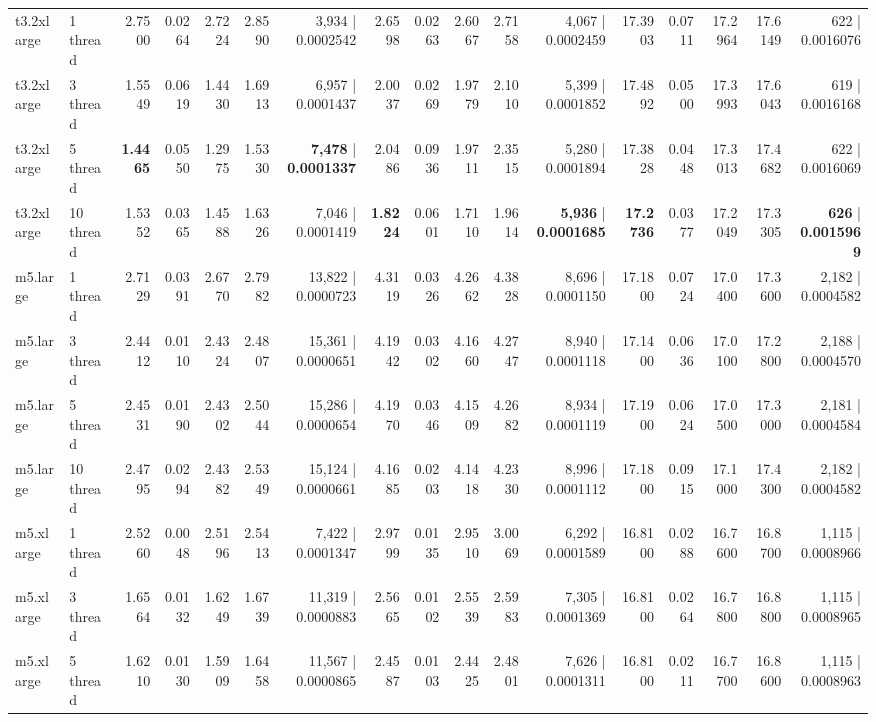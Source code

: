 \documentclass[conference]{IEEEtran}
\begin{document}
\begin{table}[h]
{\begin{tabular}{ll|rrrrr|rrrrr|rrrrr}
			\midrule
			t3.2xlarge & 1 thread & 2.7500 & 0.0264 & 2.7224 & 2.8590 & 3,934 | 0.0002542 & 2.6598 & 0.0263 & 2.6067 & 2.7158 & 4,067 | 0.0002459 & 17.3903 & 0.0711 & 17.2964 & 17.6149 & 622 | 0.0016076 \\
			t3.2xlarge & 3 thread & 1.5549 & 0.0619 & 1.4430 & 1.6913 & 6,957 | 0.0001437 & 2.0037 & 0.0269 & 1.9779 & 2.1010 & 5,399 | 0.0001852 & 17.4892 & 0.0500 & 17.3993 & 17.6043 & 619 | 0.0016168 \\
			t3.2xlarge & 5 thread & \textbf{1.4465} & 0.0550 & 1.2975 & 1.5330 & \textbf{7,478} | \textbf{0.0001337} & 2.0486 & 0.0936 & 1.9711 & 2.3515 & 5,280 | 0.0001894 & 17.3828 & 0.0448 & 17.3013 & 17.4682 & 622 | 0.0016069 \\
			t3.2xlarge & 10 thread & 1.5352 & 0.0365 & 1.4588 & 1.6326 & 7,046 | 0.0001419 & \textbf{1.8224} & 0.0601 & 1.7110 & 1.9614 & \textbf{5,936} | \textbf{0.0001685} & \textbf{17.2736} & 0.0377 & 17.2049 & 17.3305 & \textbf{626} | \textbf{0.0015969} \\
			\midrule
			m5.large & 1 thread & 2.7129 & 0.0391 & 2.6770 & 2.7982 & 13,822 | 0.0000723 & 4.3119 & 0.0326 & 4.2662 & 4.3828 & 8,696 | 0.0001150 & 17.1800 & 0.0724 & 17.0400 & 17.3600 & 2,182 | 0.0004582 \\
			m5.large & 3 thread & 2.4412 & 0.0110 & 2.4324 & 2.4807 & 15,361 | 0.0000651 & 4.1942 & 0.0302 & 4.1660 & 4.2747 & 8,940 | 0.0001118 & 17.1400 & 0.0636 & 17.0100 & 17.2800 & 2,188 | 0.0004570 \\
			m5.large & 5 thread & 2.4531 & 0.0190 & 2.4302 & 2.5044 & 15,286 | 0.0000654 & 4.1970 & 0.0346 & 4.1509 & 4.2682 & 8,934 | 0.0001119 & 17.1900 & 0.0624 & 17.0500 & 17.3000 & 2,181 | 0.0004584 \\
			m5.large & 10 thread & 2.4795 & 0.0294 & 2.4382 & 2.5349 & 15,124 | 0.0000661 & 4.1685 & 0.0203 & 4.1418 & 4.2330 & 8,996 | 0.0001112 & 17.1800 & 0.0915 & 17.1000 & 17.4300 & 2,182 | 0.0004582 \\
			\midrule
			m5.xlarge & 1 thread & 2.5260 & 0.0048 & 2.5196 & 2.5413 & 7,422 | 0.0001347 & 2.9799 & 0.0135 & 2.9510 & 3.0069 & 6,292 | 0.0001589 & 16.8100 & 0.0288 & 16.7600 & 16.8700 & 1,115 | 0.0008966 \\
			m5.xlarge & 3 thread & 1.6564 & 0.0132 & 1.6249 & 1.6739 & 11,319 | 0.0000883 & 2.5665 & 0.0102 & 2.5539 & 2.5983 & 7,305 | 0.0001369 & 16.8100 & 0.0264 & 16.7800 & 16.8800 & 1,115 | 0.0008965 \\
			m5.xlarge & 5 thread & 1.6210 & 0.0130 & 1.5909 & 1.6458 & 11,567 | 0.0000865 & 2.4587 & 0.0103 & 2.4425 & 2.4801 & 7,626 | 0.0001311 & 16.8100 & 0.0211 & 16.7700 & 16.8600 & 1,115 | 0.0008963 \\

\end{tabular}}
\end{table}
\end{document}
